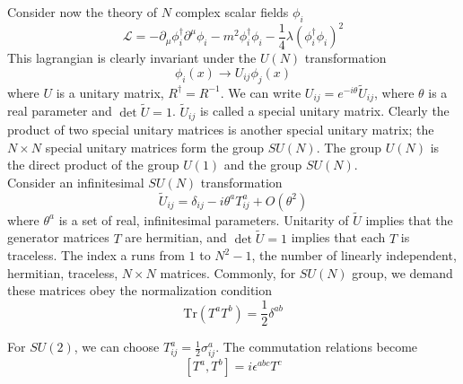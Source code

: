 \documentclass[cyan]{elegantnote}
\begin{document}
\noindent
Consider now the theory of $N$ complex scalar fields $\phi_i$
\[\mathcal{L} = -\partial_{\mu}\phi^{\dagger}_i \partial^{\mu}\phi_i - m^2\phi_i^{\dagger}\phi_i - \frac{1}{4}\lambda(\phi_i^{\dagger}\phi_i)^2\]
This lagrangian is clearly invariant under the $U(N)$ transformation
\[\phi_i(x) \to U_{ij}\phi_j(x)\]
where $U$ is a unitary matrix, $R^{\dagger} = R^{-1}$. We can write $U_{ij} = e^{-i\theta} \widetilde{U}_{ij}$, where $\theta$ is a real parameter and $\det \widetilde{U} = 1$.
$\widetilde{U}_{ij}$ is called a special unitary matrix.
Clearly the product of two special unitary matrices is another special unitary matrix; the $N \times N$ special unitary matrices form the group $SU(N)$. 
The group $U(N)$ is the direct product of the group $U(1)$ and the group $SU(N)$.\\
Consider an infinitesimal $SU(N)$ transformation
\[\widetilde{U}_{ij} = \delta_{ij} - i\theta^aT^a_{ij} + O(\theta^2)\]
where $\theta^a$ is a set of real, infinitesimal parameters. Unitarity of $\widetilde{U}$ implies that the generator matrices $T$ are hermitian, and $\det \widetilde{U} = 1$ implies that each $T$ is traceless.
The index a runs from $1$ to $N^2 - 1$, the number of linearly independent, hermitian, traceless, $N \times N$ matrices. Commonly, for $SU(N)$ group, we demand these matrices obey the normalization condition
\[\mathrm{Tr}(T^a T^b) =\frac{1}{2}\delta^{ab}\]

\begin{example}
For $SU(2)$, we can choose $T^a_{ij} = \frac{1}{2}\sigma^a_{ij}$. The commutation relations become
\[[T^a,T^b] = i\epsilon^{abc}T^c\]
\end{example}
\end{document}
